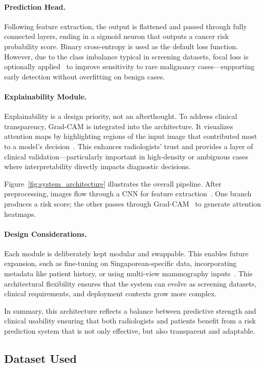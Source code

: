 \documentclass[12pt]{article}
\begin{document}
\paragraph{Prediction Head.}
Following feature extraction, the output is flattened and passed through fully connected layers, ending in a sigmoid neuron that outputs a cancer risk probability score. Binary cross-entropy is used as the default loss function. However, due to the class imbalance typical in screening datasets, focal loss is optionally applied~\cite{2} to improve sensitivity to rare malignancy cases—supporting early detection without overfitting on benign cases.

\paragraph{Explainability Module.}
Explainability is a design priority, not an afterthought. To address clinical transparency, Grad-CAM is integrated into the architecture. It visualizes attention maps by highlighting regions of the input image that contributed most to a model’s decision~\cite{5}. This enhances radiologists' trust and provides a layer of clinical validation—particularly important in high-density or ambiguous cases where interpretability directly impacts diagnostic decisions.

Figure~\ref{fig:system_architecture} illustrates the overall pipeline. After preprocessing, images flow through a CNN for feature extraction~\cite{1}. One branch produces a risk score; the other passes through Grad-CAM~\cite{5} to generate attention heatmaps.


\paragraph{Design Considerations.}
Each module is deliberately kept modular and swappable. This enables future expansion, such as fine-tuning on Singaporean-specific data, incorporating metadata like patient history, or using multi-view mammography inputs~\cite{8}. This architectural flexibility ensures that the system can evolve as screening datasets, clinical requirements, and deployment contexts grow more complex.

In summary, this architecture reflects a balance between predictive strength and clinical usability ensuring that both radiologists and patients benefit from a risk prediction system that is not only effective, but also transparent and adaptable.

\subsection{Dataset Used}
\end{document}
